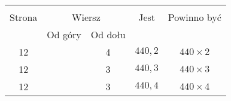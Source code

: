 \documentclass[a4paper,11pt]{article}
\begin{document}
\begin{center}

  \begin{tabular}{|c|c|c|c|c|}
    \hline
    & \multicolumn{2}{c|}{} & & \\
    Strona & \multicolumn{2}{c|}{Wiersz} & Jest
                              & Powinno być \\ \cline{2-3}
    & Od góry & Od dołu & & \\
    \hline
    12  & &  4 & $440,\! 2$ & $440 \times 2$ \\
    12  & &  3 & $440,\! 3$ & $440 \times 3$ \\
    12  & &  3 & $440,\! 4$ & $440 \times 4$ \\
    \hline
  \end{tabular}

\end{center}



\vspace{\spaceTwo}












{}






\end{document}
